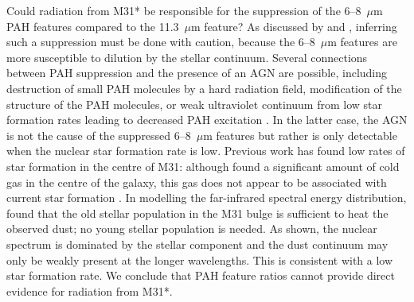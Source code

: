 Could radiation from M31* be responsible for the suppression of the  6--8~$\mu$m PAH features compared
to the 11.3~$\mu$m feature?
As discussed by  \citet{Smith:2007lr} and \citet{Smith2010}, inferring such a suppression must be done with caution, 
because the 6--8~$\mu$m features are more susceptible to dilution by the stellar continuum. 
Several connections between PAH suppression and the presence of an AGN are possible, including destruction of small PAH molecules by a hard radiation field, modification of the structure of the PAH molecules, or weak ultraviolet continuum from low star formation rates 
leading to decreased PAH excitation \citep{Smith:2007lr, Diamond2010}.  In the latter case, the AGN is not the cause of the suppressed  6--8~$\mu$m features but rather is only detectable when the nuclear star formation rate is low.
Previous work has found low rates of star formation in the centre of M31: although \citet{Melchior2013} found a significant 
amount of cold gas in the centre of the galaxy, this gas does not appear to be associated with current star formation \citep[see also][]{Li09}.
In modelling the far-infrared spectral energy distribution, \cite{Groves2012} found that  
the old stellar population in the M31 bulge is sufficient to heat the observed dust; no young stellar population is needed. As shown, the nuclear spectrum is dominated by the stellar component and the dust continuum may only be weakly  present at the longer wavelengths. This is consistent with a low star formation rate. We conclude that PAH feature ratios cannot provide direct evidence for radiation from M31*.






